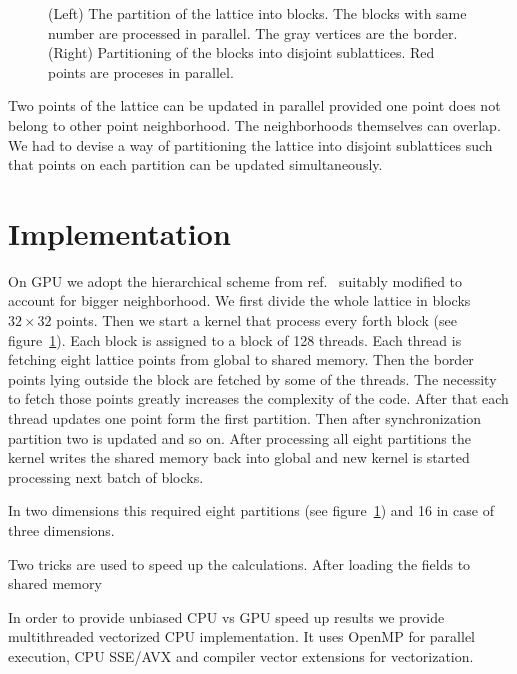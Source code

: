 \documentclass[a4paper]{llncs}
\begin{document}
\begin{figure}
\begin{center}
\end{center}
\caption{\label{fig:nn} (Left) The partition of the lattice  into blocks. The blocks with same number are processed in parallel. The gray vertices are the border.  (Right) Partitioning of the blocks into disjoint sublattices. Red points are proceses in parallel.}
\end{figure}

Two points of the lattice can be updated in parallel provided one
point does not belong to other point neighborhood. The neighborhoods
themselves can overlap.  We had to devise a way of partitioning the
lattice into disjoint sublattices such that points on each partition
can be updated simultaneously.

\section{Implementation}

On GPU we adopt the hierarchical scheme from
ref.~\cite{weigel} suitably modified to account for bigger neighborhood.
We first divide the whole lattice in blocks $32\times 32$
points. Then we start a kernel that process every forth block (see
figure~\ref{fig:nn}).  Each block is assigned to a block of 128
threads. Each thread is fetching eight lattice points from global to
shared memory. Then the border points lying outside the block are
fetched by some of the threads. The necessity to fetch those points
greatly increases the complexity of the code. After that each thread
updates one point form the first partition. Then after
synchronization partition two is updated and so on. After processing
all eight partitions the kernel writes the shared memory back into
global and new kernel is started processing next batch of blocks.

In two dimensions this required eight partitions (see
figure~\ref{fig:nn}) and 16 in case of three dimensions.

Two tricks are used to speed up the calculations. After loading the
fields to shared memory

In order to provide unbiased CPU vs GPU speed up results we provide
multithreaded vectorized CPU implementation. It uses OpenMP for parallel
execution, CPU SSE/AVX and compiler vector extensions for vectorization.
\end{document}
